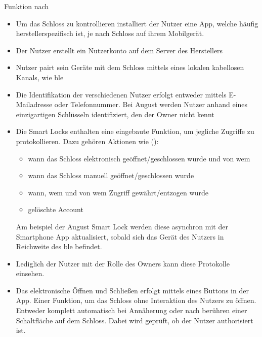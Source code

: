 		Funktion nach \citeauthor{Ho2016}
		\begin{itemize}
		    \item Um das Schloss zu kontrollieren installiert der Nutzer eine App, welche häufig herstellerspezifisch ist, je nach Schloss auf ihrem Mobilgerät.
		    \item Der Nutzer erstellt ein Nutzerkonto auf dem Server des Herstellers
		    \item Nutzer pairt sein Geräte mit dem Schloss mittels eines lokalen kabellosen Kanals, wie \gls{ble}
		    \item Die Identifikation der verschiedenen Nutzer erfolgt entweder mittels E-Mailadresse oder Telefonnummer.
		        Bei August werden Nutzer anhand eines einzigartigen Schlüsseln identifiziert, den der Owner nicht kennt\cite{Fuller2017}
		    \item Die Smart Locks enthalten eine eingebaute Funktion, um jegliche Zugriffe zu protokollieren.
		        Dazu gehören Aktionen wie (\cite{Fuller2017}):
		        \begin{itemize}
		            \item wann das Schloss elektronisch geöffnet/geschlossen wurde und von wem
		            \item wann das Schloss manuell geöffnet/geschlossen wurde
		            \item wann, wem und von wem Zugriff gewährt/entzogen wurde
		            \item gelöschte Account
		        \end{itemize}
		        Am beispiel der August Smart Lock werden diese asynchron mit der Smartphone App aktualisiert, sobald sich das Gerät des Nutzers in Reichweite des \gls{ble} befindet.
		    \item Lediglich der Nutzer mit der Rolle des Owners kann diese Protokolle einsehen.
		    \item Das elektronische Öffnen und Schließen erfolgt mittels eines Buttons in der App.
		        Einer Funktion, um das Schloss ohne Interaktion des Nutzers zu öffnen.
		        Entweder komplett automatisch bei Annäherung oder nach berühren einer Schaltfläche auf dem Schloss.
		        Dabei wird geprüft, ob der Nutzer authorisiert ist.
		\end{itemize}

